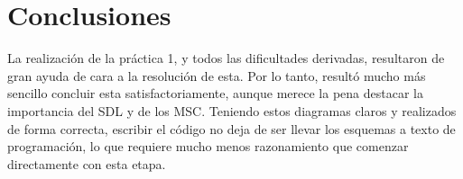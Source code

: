 \documentclass[a4paper,openright,10pt]{article}
\begin{document}
\section{Conclusiones}

La realización de la práctica 1, y todos las dificultades derivadas, resultaron de gran ayuda de cara a la resolución de esta. Por lo tanto, resultó mucho más sencillo concluir esta satisfactoriamente, aunque merece la pena destacar la importancia del SDL y de los MSC. Teniendo estos diagramas claros y realizados de forma correcta, escribir el código no deja de ser llevar los esquemas a texto de programación, lo que requiere mucho menos razonamiento que comenzar directamente con esta etapa.
\end{document}
